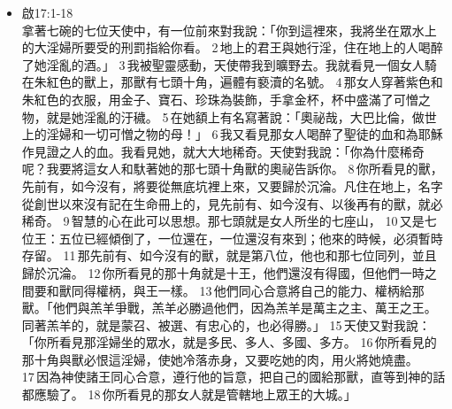 \begin{itemize}
25 耶和華說：「你這行毀滅的山哪，就是毀滅天下的山，我與你反對。我必向你伸手，將你從山巖滾下去，使你成為燒毀的山。 26 人必不從你那裡取石頭為房角石，也不取石頭為根基石，你必永遠荒涼。」這是耶和華說的。
29 地必震動而瘠苦，因耶和華向巴比倫所定的旨意成立了，使巴比倫之地荒涼，無人居住。
37 巴比倫必成為亂堆，為野狗的住處，令人驚駭、嗤笑，並且無人居住。
41 「示沙克(巴比倫)何竟被攻取！天下所稱讚的何竟被占據！巴比倫在列國中何竟變為荒場！ 42 海水漲起漫過巴比倫，她被許多海浪遮蓋。 43 她的城邑變為荒場、旱地、沙漠，無人居住、無人經過之地。 44 我必刑罰巴比倫的彼勒，使他吐出所吞的。萬民必不再流歸他那裡，巴比倫的城牆也必坍塌了。
52 耶和華說：「日子將到，我必刑罰巴比倫雕刻的偶像，通國受傷的人必唉哼。 53 巴比倫雖升到天上，雖使她堅固的高處更堅固，還有行毀滅的從我這裡到她那裡。」這是耶和華說的。
59 猶大王西底家在位第四年上巴比倫去的時候，瑪西雅的孫子、尼利亞的兒子西萊雅與王同去，西萊雅是王宮的大臣，先知耶利米有話吩咐他。 60 耶利米將一切要臨到巴比倫的災禍，就是論到巴比倫的一切話，寫在書上。 61 耶利米對西萊雅說：「你到了巴比倫，務要念這書上的話。 62 又說：『耶和華啊，你曾論到這地方說要剪除，甚至連人帶牲畜沒有在這裡居住的，必永遠荒涼。』「你念完了這書，就把一塊石頭拴在書上，扔在幼發拉底河中， 64 說：『巴比倫因耶和華所要降於她的災禍必如此沉下去，不再興起，人民也必困乏。』」耶利米的話到此為止。
\item 啟17:1-18\\
拿著七碗的七位天使中，有一位前來對我說：「你到這裡來，我將坐在眾水上的大淫婦所要受的刑罰指給你看。 2 地上的君王與她行淫，住在地上的人喝醉了她淫亂的酒。」 3 我被聖靈感動，天使帶我到曠野去。我就看見一個女人騎在朱紅色的獸上，那獸有七頭十角，遍體有褻瀆的名號。 4 那女人穿著紫色和朱紅色的衣服，用金子、寶石、珍珠為裝飾，手拿金杯，杯中盛滿了可憎之物，就是她淫亂的汙穢。 5 在她額上有名寫著說：「奧祕哉，大巴比倫，做世上的淫婦和一切可憎之物的母！」 6 我又看見那女人喝醉了聖徒的血和為耶穌作見證之人的血。我看見她，就大大地稀奇。天使對我說：「你為什麼稀奇呢？我要將這女人和馱著她的那七頭十角獸的奧祕告訴你。 8 你所看見的獸，先前有，如今沒有，將要從無底坑裡上來，又要歸於沉淪。凡住在地上，名字從創世以來沒有記在生命冊上的，見先前有、如今沒有、以後再有的獸，就必稀奇。 9 智慧的心在此可以思想。那七頭就是女人所坐的七座山， 10 又是七位王：五位已經傾倒了，一位還在，一位還沒有來到；他來的時候，必須暫時存留。 11 那先前有、如今沒有的獸，就是第八位，他也和那七位同列，並且歸於沉淪。 12 你所看見的那十角就是十王，他們還沒有得國，但他們一時之間要和獸同得權柄，與王一樣。 13 他們同心合意將自己的能力、權柄給那獸。「他們與羔羊爭戰，羔羊必勝過他們，因為羔羊是萬主之主、萬王之王。同著羔羊的，就是蒙召、被選、有忠心的，也必得勝。」 15 天使又對我說：「你所看見那淫婦坐的眾水，就是多民、多人、多國、多方。 16 你所看見的那十角與獸必恨這淫婦，使她冷落赤身，又要吃她的肉，用火將她燒盡。 17 因為神使諸王同心合意，遵行他的旨意，把自己的國給那獸，直等到神的話都應驗了。 18 你所看見的那女人就是管轄地上眾王的大城。」

\end{itemize}
